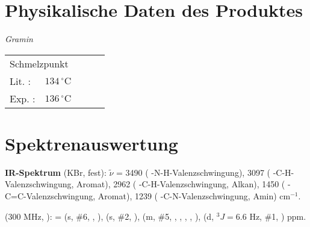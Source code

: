 \documentclass[12pt]{article}
\begin{document}
\begin{onehalfspace}
\section{Physikalische Daten des Produktes}
\textit{Gramin} \\[0.2cm]
\begin{tabular}{ lrclc }
 \multicolumn{2}{l}{Schmelzpunkt} & &   \\
   Lit. \cite{organikum} : & $ 134 \,^{\circ}\mathrm{C} $ & &  \\
   Exp. :& $ 136 \,^{\circ}\mathrm{C} $ & &  \\
 \end{tabular}

\section{Spektrenauswertung}
\textbf{IR-Spektrum} (KBr, fest): $\tilde{\nu}$ = 3490 ( -N-H-Valenzschwingung), 3097 ( -C-H-Valenzschwingung, Aromat), 2962 ( -C-H-Valenzschwingung, Alkan), 1450 ( -C=C-Valenzschwingung, \mbox{Aromat}), 1239 ( -C-N-Valenzschwingung, Amin) cm$^{-1}$.\\

\begin{experimental}[format=\bfseries,delta=(ppm),list=true,use-equal,pos-number = side]
\begin{minipage}[b]{0.70\textwidth}
\NMR* (300 \si{\MHz}, ): \chemdelta =
 (s, \#{6}, , ),
 (s, \#{2}, ),
 (m, \#{5}, , , , , ),\hspace{5mm}
 (d, $^{3\!}J = 6.6$ \si{\Hz}, \#{1}, ) ppm.
\end{minipage}
 \hfill
\begin{minipage}[t][][b]{0.30\textwidth}

\end{minipage}
\end{experimental}


\end{onehalfspace}
\end{document}
